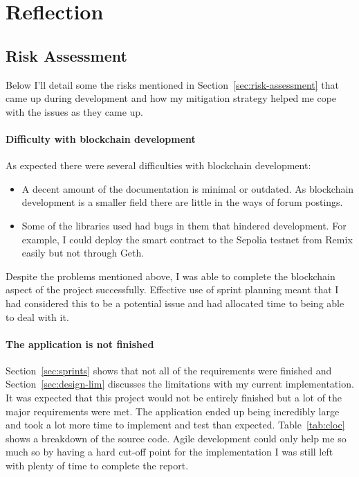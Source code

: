 \section{Reflection}

\subsection*{Risk Assessment}

Below I'll detail some the risks mentioned in Section~\ref{sec:risk-assessment} that came up during development and how my mitigation strategy helped me cope with the issues as they came up.

\paragraph*{Difficulty with blockchain development}
As expected there were several difficulties with blockchain development:

\begin{itemize}
  \item A decent amount of the documentation is minimal or outdated. As blockchain development is a smaller field there are little in the ways of forum postings.
  \item Some of the libraries used had bugs in them that hindered development. For example, I could deploy the smart contract to the Sepolia testnet from Remix easily but not through Geth. 
\end{itemize}

\vspace{2mm}\noindent
Despite the problems mentioned above, I was able to complete the blockchain aspect of the project successfully. Effective use of sprint planning meant that I had considered this to be a potential issue and had allocated time to being able to deal with it.

\paragraph*{The application is not finished}
Section~\ref{sec:sprints} shows that not all of the requirements were finished and Section~\ref{sec:design-lim} discusses the limitations with my current implementation. It was expected that this project would not be entirely finished but a lot of the major requirements were met.
\x
The application ended up being incredibly large and took a lot more time to implement and test than expected. Table~\ref{tab:cloc} shows a breakdown of the source code. Agile development could only help me so much so by having a hard cut-off point for the implementation I was still left with plenty of time to complete the report.

